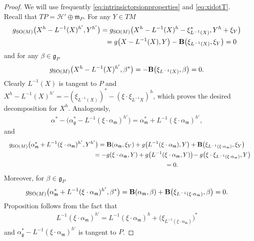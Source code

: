 \documentclass[10pt,a4paper]{amsart}
\numberwithin{equation}{section}
\begin{document}
\begin{proof}
We will use frequently \eqref{eq:intrinsictorsionproperties} and \eqref{eq:xidotT}. Recall that $TP=\mathcal{H}'\oplus\mathfrak{m}_P$. For any $Y\in TM$
\begin{gather*}
g_{{\rm SO}(M)}\big(X^h-L^{-1}(X)^{h'},Y^{h'}\big) =g_{{\rm SO}(M)}\big(X^h-L^{-1}(X)^h-\xi_{L^{-1}(X)}^{\ast},Y^h+\xi_Y\big)\\
\hphantom{g_{{\rm SO}(M)}\big(X^h-L^{-1}(X)^{h'},Y^{h'}\big)}{} =g\big(X-L^{-1}(X),Y\big)-{\bf B}\big(\xi_{L^{-1}(X)},\xi_Y\big)=0
\end{gather*}
and for any $\beta\in\mathfrak{g}_P$
\begin{gather*}
g_{{\rm SO}(M)}\big(X^h-L^{-1}(X)^{h'},\beta^{\ast}\big)=-{\bf B}\big(\xi_{L^{-1}(X)},\beta\big)=0.
\end{gather*}
Clearly $L^{-1}(X)$ is tangent to $P$ and $X^h-L^{-1}(X)^{h'}=-(\xi_{L^{-1}(X)})^{\ast}-(\xi\cdot\xi_{L^{-1}X})^h$, which proves the desired decomposition for $X^h$. Analogously, \begin{gather*}
\alpha^{\ast}-\big(\alpha_{\mathfrak{g}}^{\ast}-L^{-1}(\xi\cdot\alpha_{\mathfrak{m}})^{h'}\big)=
\alpha_{\mathfrak{m}}^{\ast}+L^{-1}(\xi\cdot\alpha_{\mathfrak{m}})^{h'},
\end{gather*}
and
\begin{gather*}
g_{{\rm SO}(M)}\big(\alpha_{\mathfrak{m}}^{\ast}+L^{-1}(\xi\cdot\alpha_{\mathfrak{m}})^{h'},Y^{h'}\big) =
{\bf B}(\alpha_{\mathfrak{m}},\xi_Y)+g\big(L^{-1}(\xi\cdot\alpha_{\mathfrak{m}}),Y\big)+{\bf B}\big(\xi_{L^{-1}(\xi\cdot\alpha_{\mathfrak{m}})},\xi_Y\big)\\
\hphantom{g_{{\rm SO}(M)}\big(\alpha_{\mathfrak{m}}^{\ast}+L^{-1}(\xi\cdot\alpha_{\mathfrak{m}})^{h'},Y^{h'}\big)}{}
=-g(\xi\cdot\alpha_{\mathfrak{m}},Y)
+g\big(L^{-1}(\xi\cdot\alpha_{\mathfrak{m}},Y)\big)\!-g\big(\xi\cdot\xi_{L^{-1}(\xi\cdot\alpha_{\mathfrak{m}})},Y\big)\!\\
\hphantom{g_{{\rm SO}(M)}\big(\alpha_{\mathfrak{m}}^{\ast}+L^{-1}(\xi\cdot\alpha_{\mathfrak{m}})^{h'},Y^{h'}\big)}{}=0.
\end{gather*}
Moreover, for $\beta\in\mathfrak{g}_P$
\begin{gather*}
g_{{\rm SO}(M)}\big(\alpha_{\mathfrak{m}}^{\ast}+L^{-1}(\xi\cdot\alpha_{\mathfrak{m}})^{h'},\beta^{\ast}\big)=
{\bf B}(\alpha_{\mathfrak{m}},\beta)
+{\bf B}\big(\xi_{L^{-1}(\xi\cdot\alpha_{\mathfrak{m}})},\beta\big)=0.
\end{gather*}
Proposition follows from the fact that
\begin{gather*}
L^{-1}(\xi\cdot\alpha_{\mathfrak{m}})^{h'}=L^{-1}(\xi\cdot\alpha_{\mathfrak{m}})^h+\big(\xi_{L^{-1}(\xi\cdot\alpha_{\mathfrak{m}})}\big)^{\ast}
\end{gather*}
and $\alpha_{\mathfrak{g}}^{\ast}-L^{-1}(\xi\cdot\alpha_{\mathfrak{m}})^{h'}$ is tangent to $P$.
\end{proof}
\end{document}
